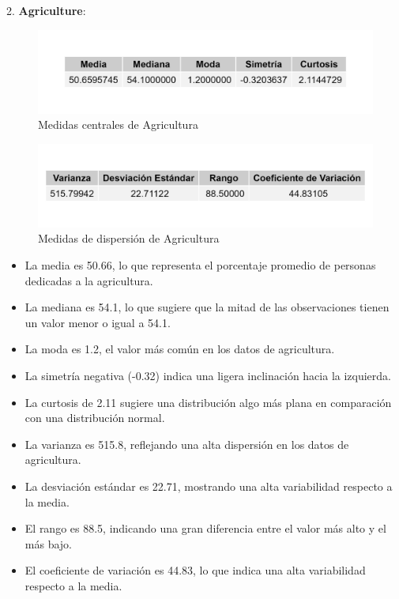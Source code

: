 \documentclass{article}
\begin{document}
2. \textbf{Agriculture}:
\begin{figure}[h!]
    \centering
    \includegraphics[width=\textwidth]{Swiss/Agriculture_central.png}
    \caption{Medidas centrales de Agricultura}
\end{figure}

\begin{figure}[h!]
    \centering
    \includegraphics[width=\textwidth]{Swiss/Agriculture_dispersion.png}
    \caption{Medidas de dispersión de Agricultura}
\end{figure}
\begin{itemize}
    \item La media es 50.66, lo que representa el porcentaje promedio de personas dedicadas a la agricultura.
       \item La mediana es 54.1, lo que sugiere que la mitad de las observaciones tienen un valor menor o igual a 54.1.
       \item La moda es 1.2, el valor más común en los datos de agricultura.
       \item La simetría negativa (-0.32) indica una ligera inclinación hacia la izquierda.
       \item La curtosis de 2.11 sugiere una distribución algo más plana en comparación con una distribución normal.
       \item La varianza es 515.8, reflejando una alta dispersión en los datos de agricultura.
       \item La desviación estándar es 22.71, mostrando una alta variabilidad respecto a la media.
       \item El rango es 88.5, indicando una gran diferencia entre el valor más alto y el más bajo.
       \item El coeficiente de variación es 44.83, lo que indica una alta variabilidad respecto a la media.
   \end{itemize}
\end{document}
